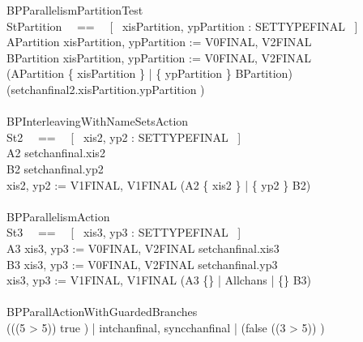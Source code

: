 \begin{circus}
 \circprocess BPParallelismPartitionTest \circdef \circbegin \\
    \circstate StPartition ~~==~~ [~ xisPartition, ypPartition : SETTYPEFINAL ~] \\
    APartition \circdef xisPartition, ypPartition := V0FINAL, V2FINAL \\
    BPartition \circdef xisPartition, ypPartition := V0FINAL, V2FINAL \\
    \circspot %
	(APartition \linter \{ xisPartition \} | \{ ypPartition \} \rinter BPartition) \circseq (setchanfinal2.xisPartition.ypPartition \then \Skip) \\
 \circend \\

 \circprocess BPInterleavingWithNameSetsAction \circdef \circbegin \\
    \circstate St2 ~~==~~ [~ xis2, yp2 : SETTYPEFINAL ~] \\
    A2 \circdef %
      setchanfinal.xis2 \then \Skip \\
    B2 \circdef %
      setchanfinal.yp2 \then \Skip \\
    \circspot xis2, yp2 := V1FINAL, V1FINAL \circseq (A2 \linter \{ xis2 \} | \{ yp2 \} \rinter B2) \\
 \circend \\

 \circprocess BPParallelismAction \circdef \circbegin \\
    \circstate St3 ~~==~~ [~ xis3, yp3 : SETTYPEFINAL ~] \\
    A3 \circdef xis3, yp3 := V0FINAL, V2FINAL \circseq setchanfinal.xis3 \then \Skip \\
    B3 \circdef xis3, yp3 := V0FINAL, V2FINAL \circseq setchanfinal.yp3 \then \Skip \\
    \circspot xis3, yp3 := V1FINAL, V1FINAL \circseq (A3 \lpar \{\} | Allchans | \{\} \rpar B3) \\
 \circend \\

 \circprocess BPParallActionWithGuardedBranches \circdef \circbegin \\
    \circspot (\lcircguard (\lnot (5 > 5)) \land true \rcircguard \circguard \Skip) \lpar | \lchanset intchanfinal, syncchanfinal \rchanset | \rpar (\lcircguard false \lor (\lnot (3 > 5)) \rcircguard \circguard \Skip) \\
 \circend \\


\end{circus}
